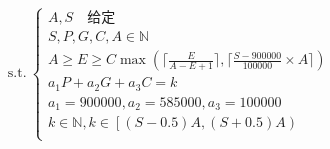 \documentclass[preview]{standalone}
\begin{document}
\begin{align*}
\text{s.t.}~\begin{cases}A, S \quad \text{给定} \\S, P, G, C, A \in \mathbb{N} \\A \geq E \geq C \max(\lceil \frac{E}{A - E + 1} \rceil, \lceil \frac{S - 900000}{100000} \times A \rceil) \\a_1 P + a_2 G + a_3 C = k \\a_1 = 900000, a_2 = 585000, a_3 = 100000 \\k \in \mathbb{N}, k \in \left[ (S - 0.5)A, (S + 0.5)A \right) \\\end{cases}
\end{align*}
\end{document}
